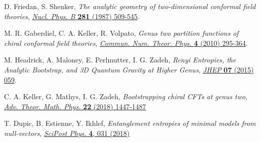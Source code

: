 \documentclass[a4paper,11pt]{article}
\begin{document}
\begin{thebibliography}{99}
 D. Friedan, S. Shenker, \emph{The analytic geometry of two-dimensional conformal field theories}, \href{https://doi.org/10.1016/0550-3213(87)90418-4}{\emph{Nucl. Phys. B} {\bf 281} (1987) 509-545}.

 M. R. Gaberdiel, C. A. Keller, R. Volpato, \emph{Genus two partition functions of chiral conformal field theories},
\href{https://dx.doi.org/10.4310/CNTP.2010.v4.n2.a2}{\emph{Commun. Num. Theor. Phys.} {\bf 4} (2010) 295-364}.

 M. Headrick, A. Maloney, E. Perlmutter, I. G. Zadeh, \emph{Renyi Entropies, the Analytic Bootstrap, and 3D Quantum Gravity at Higher Genus}, \href{https://doi.org/10.1007/JHEP07(2015)059}{\emph{JHEP} {\bf 07} (2015) 059}.

 C. A. Keller, G. Mathys, I. G. Zadeh, \emph{Bootstrapping chiral CFTs at genus two},
\href{https://dx.doi.org/10.4310/ATMP.2018.v22.n6.a3}{\emph{Adv. Theor. Math. Phys.} {\bf 22} (2018) 1447-1487}

 T. Dupic, B. Estienne, Y. Ikhlef, \emph{Entanglement entropies of minimal models from null-vectors}, 
\href{https://scipost.org/10.21468/SciPostPhys.4.6.031}{\emph{SciPost Phys.} {\bf 4}, 031 (2018)}





\end{thebibliography}
\end{document}
